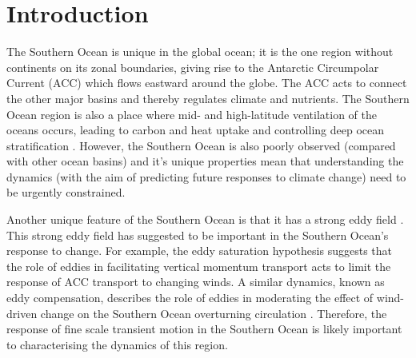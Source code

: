 \documentclass{agujournal2019}
\begin{document}
%
%

\section{Introduction}

The Southern Ocean is unique in the global ocean; it is the one region without continents on its zonal boundaries, giving rise to the Antarctic Circumpolar Current (ACC) which flows eastward around the globe.
The ACC acts to connect the other major basins and thereby regulates climate and nutrients.
The Southern Ocean region is also a place where mid- and high-latitude ventilation of the oceans occurs, leading to carbon and heat uptake and controlling deep ocean stratification \citep{Rousselet2021, Morrison2021}.
However, the Southern Ocean is also poorly observed (compared with other ocean basins) and it's unique properties mean that understanding the dynamics (with the aim of predicting future responses to climate change) need to be urgently constrained.

Another unique feature of the Southern Ocean is that it has a strong eddy field \citep{Fu2010}.
This strong eddy field has suggested to be important in the Southern Ocean's response to change.
For example, the eddy saturation hypothesis \citep{Hallberg2006, Meredith-Hogg-2006, Munday2013, Constantinou2019} suggests that the role of eddies in facilitating vertical momentum transport acts to limit the response of ACC transport to changing winds.
A similar dynamics, known as eddy compensation, describes the role of eddies in moderating the effect of wind-driven change on the Southern Ocean overturning circulation \citep{Morrison2013a}.
Therefore, the response of fine scale transient motion in the Southern Ocean is likely important to characterising the dynamics of this region.
\end{document}
